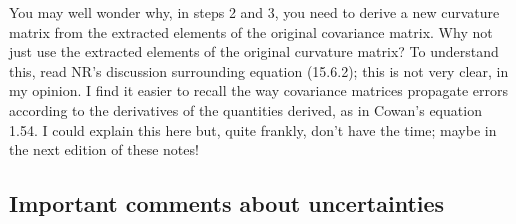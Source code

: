 \documentclass[psfig,preprint]{aastex}
\begin{document}
	You may well wonder why, in steps 2 and 3, you need to derive a
new curvature matrix from the extracted elements of the original
covariance matrix. Why not just use the extracted elements of the
original curvature matrix? To understand this, read NR's discussion
surrounding equation (15.6.2); this is not very clear, in my opinion. I
find it easier to recall the way covariance matrices propagate errors
according to the derivatives of the quantities derived, as in Cowan's
equation 1.54. I could explain this here but, quite frankly, don't have
the time; maybe in the next edition of these notes!


\subsection{ Important comments about uncertainties}
\end{document}
